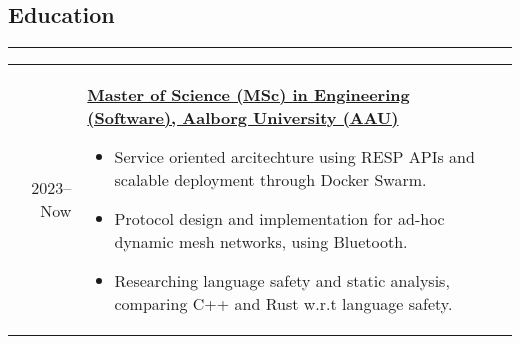 \documentclass[a4paper]{report}
\def\secsep{\hrule width5cm}
\begin{document}
\newcommand{\p}[1]{\textbf{#1}\mbox{}\newline}
\def\n{\\\\}
\subsection*{Education}
\secsep
\begin{longtabu} to \textwidth {r|X}
    2023--Now & \p{\href{https://studieordninger.aau.dk/2023/41/4304}{Master of Science (MSc) in Engineering (Software), Aalborg University (AAU)}}
    \vspace{-1em}
    \begin{itemize}[leftmargin=2em, topsep=-.5em, parsep=0em]
        \item Service oriented arcitechture using RESP APIs and scalable deployment through Docker Swarm.
        \item Protocol design and implementation for ad-hoc dynamic mesh networks, using Bluetooth.
        \item Researching language safety and static analysis, comparing C++ and Rust w.r.t language safety.


\end{itemize}
\end{longtabu}
\end{document}
